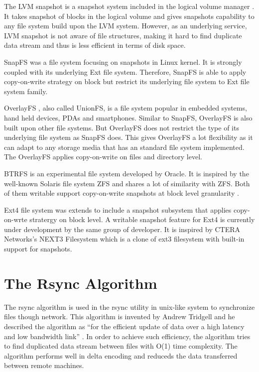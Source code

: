     The LVM snapshot is a snapshot system included in the logical volume manager \cite{lvm}\cite{disk_perform_lvm}. It takes snapshot of blocks in the logical volume and gives snapshots capability to any file system build upon the LVM system. However, as an underlying service, LVM snapshot is not aware of file structures, making it hard to find duplicate data stream and thus is less efficient in terms of disk space.
    
    SnapFS was a file system focusing on snapshots in Linux kernel. \cite{snapfs} It is strongly coupled with its underlying Ext file system. Therefore, SnapFS is able to apply copy-on-write strategy on block but restrict its underlying file system to Ext file system family. 
    
    OverlayFS \cite{overlayfs}, also called UnionFS, is a file system popular in embedded systems, hand held devices, PDAs and smartphones. Similar to SnapFS, OverlayFS is also built upon other file systems. But OverlayFS does not restrict the type of its underlying file system as SnapFS does. This gives OverlayFS a lot flexibility as it can adapt to any storage media that has an standard file system implemented. The OverlayFS applies copy-on-write on files and directory level.

    BTRFS \cite{btrfs} is an experimental file system developed by Oracle. It is inspired by the well-known Solaris file system ZFS and shares a lot of similarity with ZFS. Both of them writable support copy-on-write snapshots at block level granularity \cite{btrfscow}.
    
    Ext4 file system was extends to include a snapshot subsystem that applies copy-on-wrte stratergy on block level. A writable snapshot feature for Ext4 is currently under development by the same group of developer.\cite{ext4snap} It is inspired by CTERA Networks's NEXT3 Filesystem which is a clone of ext3 filesystem with built-in support for snapshots.

\section{The Rsync Algorithm}
    
    The rsync algorithm is used in the rsync utility in unix-like system to synchronize files though network. This algorithm is invented by Andrew Tridgell and he described the algorithm as ``for the efficient update of data over a high latency and low bandwidth link'' \cite{rsync_alg}. In order to achieve such efficiency, the algorithm tries to find duplicated data stream between files with O(1) time complexity. The algorithm performs well in delta encoding and reduceds the data transferred between remote machines.
